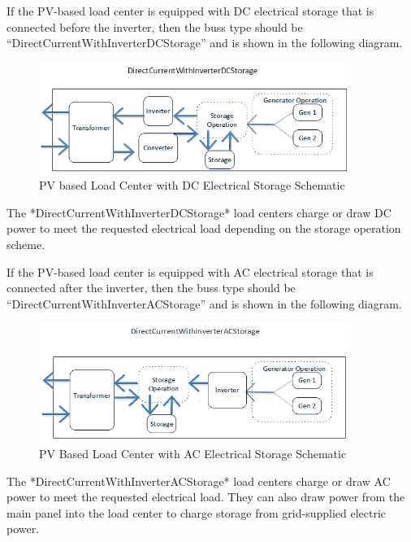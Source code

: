 If the PV-based load center is equipped with DC electrical storage that is connected before the inverter, then the buss type should be “DirectCurrentWithInverterDCStorage” and is shown in the following diagram.

\begin{figure}[hbtp] %
\centering
\includegraphics[width=0.9\textwidth, height=0.9\textheight, keepaspectratio=true]{media/DCInverterWithDCStorageBussDiagram.png}
\caption{PV based Load Center with DC Electrical Storage Schematic \protect \label{fig:pv-based-load-center-with-dc-electrical}}
\end{figure}

The *DirectCurrentWithInverterDCStorage* load centers charge or draw DC power to meet the requested electrical load depending on the storage operation scheme.

If the PV-based load center is equipped with AC electrical storage that is connected after the inverter, then the buss type should be “DirectCurrentWithInverterACStorage” and is shown in the following diagram.

\begin{figure}[hbtp] %
\centering
\includegraphics[width=0.9\textwidth, height=0.9\textheight, keepaspectratio=true]{media/DCInverterWithACStorageBussDiagram.png}
\caption{PV Based Load Center with AC Electrical Storage Schematic \protect \label{fig:pv-based-load-center-with-ac-electrical}}
\end{figure}

The *DirectCurrentWithInverterACStorage* load centers charge or draw AC power to meet the requested electrical load.  They can also draw power from the main panel into the load center to charge storage from grid-supplied electric power.


